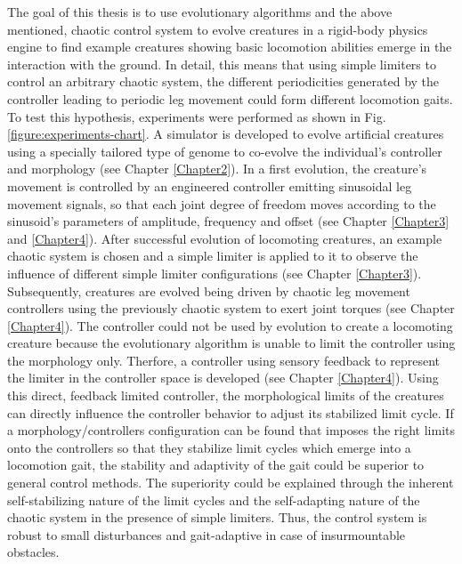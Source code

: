 \documentclass[main]{subfiles}
\begin{document}
The goal of this thesis is to use evolutionary algorithms and the above mentioned, chaotic control system to evolve creatures in a rigid-body physics engine to find example creatures showing basic locomotion abilities emerge in the interaction with the ground. %
%
In detail, this means that using simple limiters to control an arbitrary chaotic system, the different periodicities generated by the controller leading to periodic leg movement could form different locomotion gaits. %
%
To test this hypothesis, experiments were performed as shown in Fig. \ref{figure:experiments-chart}. %
%
A simulator is developed to evolve artificial creatures using a specially tailored type of genome to co-evolve the individual's controller and morphology (see Chapter \ref{Chapter2}). %
%
In a first evolution, the creature's movement is controlled by an engineered controller emitting sinusoidal leg movement signals, so that each joint degree of freedom moves according to the sinusoid's parameters of amplitude, frequency and offset (see Chapter \ref{Chapter3} and \ref{Chapter4}). %
%
After successful evolution of locomoting creatures, an example chaotic system is chosen and a simple limiter is applied to it to observe the influence of different simple limiter configurations (see Chapter \ref{Chapter3}). %
%
Subsequently, creatures are evolved being driven by chaotic leg movement controllers using the previously chaotic system to exert joint torques (see Chapter \ref{Chapter4}). %
%
The controller could not be used by evolution to create a locomoting creature because the evolutionary algorithm is unable to limit the controller using the morphology only. %
%
Therfore, a controller using sensory feedback to represent the limiter in the controller space is developed (see Chapter \ref{Chapter4}). %
%
Using this direct, feedback limited controller, the morphological limits of the creatures can directly influence the controller behavior to adjust its stabilized limit cycle. %
%
If a morphology/controllers configuration can be found that imposes the right limits onto the controllers so that they stabilize limit cycles which emerge into a locomotion gait, the stability and adaptivity of the gait could be superior to general control methods. %
%
The superiority could be explained through the inherent self-stabilizing nature of the limit cycles and the self-adapting nature of the chaotic system in the presence of simple limiters. %
%
Thus, the control system is robust to small disturbances and gait-adaptive in case of insurmountable obstacles. %
\end{document}
